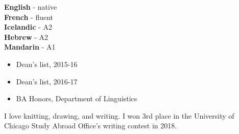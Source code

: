 \documentclass[9pt]{developercv} %
\begin{document}
\begin{minipage}[t]{0.3\textwidth}
	\vspace{-\baselineskip} %

	
	\textbf{English} - native\\
	\textbf{French} - fluent\\
	\textbf{Icelandic} - A2\\
	\textbf{Hebrew} - A2 \\
	\textbf{Mandarin} - A1 \\
\end{minipage}
\hfill
\begin{minipage}[t]{0.3\textwidth}
	\vspace{-\baselineskip} %
	\begin{itemize}[noitemsep, topsep=0pt]
	\item Dean's list, 2015-16
	\item Dean's list, 2016-17
	\item BA Honors, Department of Linguistics
	\end{itemize}
\end{minipage}
\hfill
\begin{minipage}[t]{0.3\textwidth}
	\vspace{-\baselineskip} %
	
	
	I love knitting, drawing, and writing. I won 3rd place in the University of Chicago Study Abroad Office's writing contest in 2018. 
\end{minipage}
\hfill
\begin{minipage}[t]{0.5\textwidth}
	
	
	
\end{minipage}

\end{document}
